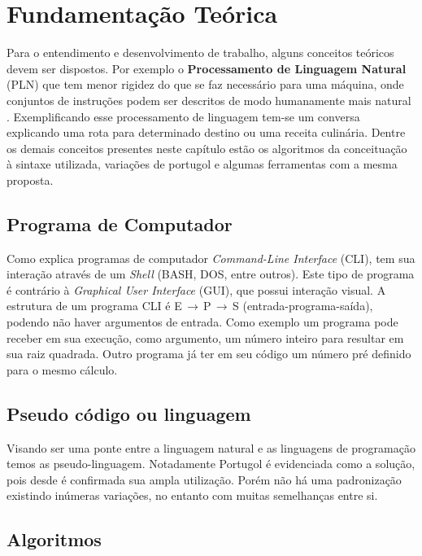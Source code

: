 \chapter{Fundamentação Teórica}

Para o entendimento e desenvolvimento de trabalho, alguns conceitos teóricos devem ser dispostos. Por exemplo o \textbf{Processamento de Linguagem Natural} (PLN) que tem menor rigidez do que se faz necessário para uma máquina, onde conjuntos de instruções podem ser descritos de modo humanamente mais natural \cite{medina2006etal}. Exemplificando esse processamento de linguagem tem-se um conversa explicando uma rota para determinado destino ou uma receita culinária. Dentre os demais conceitos presentes neste capítulo estão os algoritmos da conceituação à sintaxe utilizada, variações de portugol e algumas ferramentas com a mesma proposta.

\section{Programa de Computador}

Como explica  programas de computador \textit{Command-Line Interface} (CLI), tem sua interação através de um \textit{Shell} (BASH, DOS, entre outros). Este tipo de programa é contrário à \textit{Graphical User Interface} (GUI), que possui interação visual. A estrutura de um programa CLI é E$\,\to\,$P$\,\to\,$S (entrada-programa-saída), podendo não haver argumentos de entrada. Como exemplo um programa pode receber em sua execução, como argumento, um número inteiro para resultar em sua raiz quadrada. Outro programa já ter em seu código um número pré definido para o mesmo cálculo.

\section{Pseudo código ou linguagem}

Visando ser uma ponte entre a linguagem natural e as linguagens de programação temos as pseudo-linguagem. Notadamente Portugol é evidenciada como a solução, pois desde  é confirmada sua ampla utilização. Porém não há uma padronização existindo inúmeras variações, no entanto com muitas semelhanças entre si.

\section{Algoritmos}

